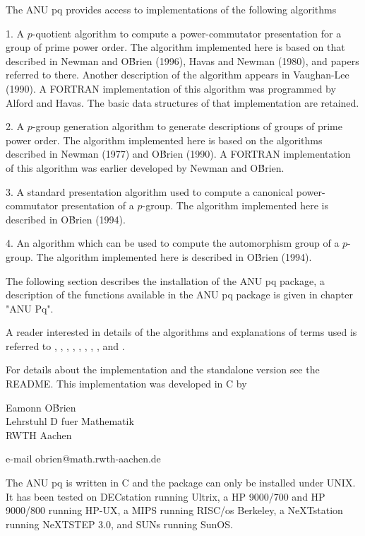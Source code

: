 
The   ANU  pq  provides  access  to  implementations   of  the  following
algorithms\:

1.  A $p$-quotient algorithm  to compute  a power-commutator presentation
for a group  of  prime power order.  The  algorithm implemented  here  is
based on that described in Newman and O\'Brien (1996), Havas and Newman 
(1980), and papers referred to there.   Another  description  of  the  
algorithm appears in  Vaughan-Lee (1990).  A FORTRAN implementation  of 
this algorithm  was  programmed  by Alford and Havas.  The basic  data 
structures  of that implementation are retained.

2. A $p$-group generation algorithm to generate descriptions of groups of
prime  power  order.   The  algorithm  implemented here is based  on  the
algorithms described in Newman  (1977)  and O\'Brien  (1990).  A  FORTRAN
implementation of  this  algorithm  was  earlier  developed by Newman and
O\'Brien.

3.   A  standard presentation   algorithm  used  to compute  a  canonical
power-commutator presentation  of a $p$-group. The  algorithm implemented
here is described in O\'Brien (1994).

4. An algorithm which can be used to compute  the automorphism group of a
$p$-group. The algorithm implemented here is described in O\'Brien (1994).

The following section describes the installation of the ANU pq package, a
description of the functions available in the  ANU pq package is given in
chapter "ANU Pq".

A reader interested  in details  of the  algorithms  and explanations  of
terms  used  is  referred  to  \cite{NOBr96}, \cite{HN80},  \cite{OBr90},  
\cite{OBr94}, \cite{OBr95},    \cite{New77},    \cite{Vau84},     
\cite{Vau90a},  and \cite{Vau90b}.

For  details about  the implementation and the standalone version see the
README. This implementation was developed in C by

Eamonn O\'Brien\\
Lehrstuhl D fuer Mathematik\\
RWTH Aachen

e-mail obrien@math.rwth-aachen.de


The ANU  pq is written  in C and the  package can only be installed under
UNIX.  It has been tested on DECstation running Ultrix, a HP 9000/700 and
HP 9000/800 running HP-UX, a MIPS running RISC/os Berkeley, a NeXTstation
running NeXTSTEP 3.0, and SUNs running SunOS.

